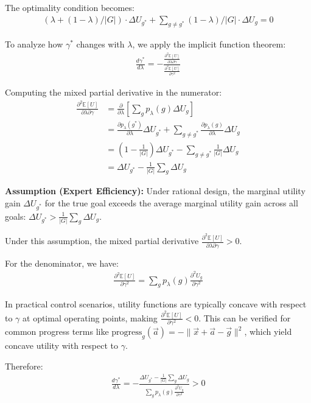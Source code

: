 \documentclass[11pt]{article}
\begin{document}
The optimality condition becomes:
\begin{align}
(\lambda + (1-\lambda)/|G|) \cdot \Delta U_{g^*} + \sum_{g \neq g^*} (1-\lambda)/|G| \cdot \Delta U_g = 0
\end{align}

To analyze how $\gamma^*$ changes with $\lambda$, we apply the implicit function theorem:
\begin{align}
\frac{d\gamma^*}{d\lambda} = -\frac{\frac{\partial^2 \mathbb{E}[U]}{\partial \lambda \partial \gamma}}{\frac{\partial^2 \mathbb{E}[U]}{\partial \gamma^2}}
\end{align}

Computing the mixed partial derivative in the numerator:
\begin{align}
\frac{\partial^2 \mathbb{E}[U]}{\partial \lambda \partial \gamma} &= \frac{\partial}{\partial \lambda}\left[\sum_g p_\lambda(g) \Delta U_g\right] \\
&= \frac{\partial p_\lambda(g^*)}{\partial \lambda} \Delta U_{g^*} + \sum_{g \neq g^*} \frac{\partial p_\lambda(g)}{\partial \lambda} \Delta U_g \\
&= \left(1 - \frac{1}{|G|}\right) \Delta U_{g^*} - \sum_{g \neq g^*} \frac{1}{|G|} \Delta U_g \\
&= \Delta U_{g^*} - \frac{1}{|G|}\sum_g \Delta U_g
\end{align}

\textbf{Assumption (Expert Efficiency):} Under rational design, the marginal utility 
gain $\Delta U_{g^*}$ for the true goal exceeds the average marginal utility 
gain across all goals: $\Delta U_{g^*} > \frac{1}{|G|}\sum_g \Delta U_g$. 

Under this assumption, the mixed partial derivative $\frac{\partial^2 \mathbb{E}[U]}{\partial \lambda \partial \gamma} > 0$.

For the denominator, we have:
\begin{align}
\frac{\partial^2 \mathbb{E}[U]}{\partial \gamma^2} = \sum_g p_\lambda(g) \frac{\partial^2 U_g}{\partial \gamma^2}
\end{align}

In practical control scenarios, utility functions are typically concave 
with respect to $\gamma$ at optimal operating points, making 
$\frac{\partial^2 \mathbb{E}[U]}{\partial \gamma^2} < 0$. This can be verified 
for common progress terms like $\text{progress}_g(\vec{a}) = -\|\vec{x} + \vec{a} - \vec{g}\|^2$, 
which yield concave utility with respect to $\gamma$.

Therefore:
\begin{align}
\frac{d\gamma^*}{d\lambda} = -\frac{\Delta U_{g^*} - \frac{1}{|G|}\sum_g \Delta U_g}{\sum_g p_\lambda(g) \frac{\partial^2 U_g}{\partial \gamma^2}} > 0
\end{align}
\end{document}
